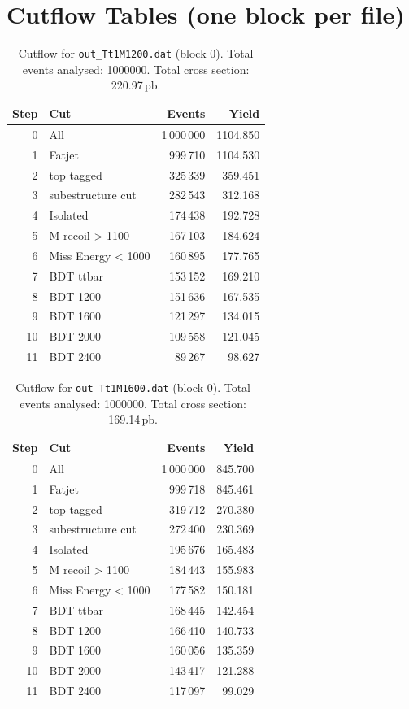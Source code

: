 \documentclass{article}
\begin{document}
\section*{Cutflow Tables (one block per file)}
\begin{table}[H]
\centering
\begin{tabular}{r l r r}
\toprule
Step & Cut & Events & Yield \\
\midrule
0 & All & 1\,000\,000 & 1104.850 \\
1 & Fatjet & 999\,710 & 1104.530 \\
2 & top tagged & 325\,339 & 359.451 \\
3 & subestructure cut & 282\,543 & 312.168 \\
4 & Isolated & 174\,438 & 192.728 \\
5 & M recoil > 1100 & 167\,103 & 184.624 \\
6 & Miss Energy < 1000 & 160\,895 & 177.765 \\
7 & BDT ttbar & 153\,152 & 169.210 \\
8 & BDT 1200 & 151\,636 & 167.535 \\
9 & BDT 1600 & 121\,297 & 134.015 \\
10 & BDT 2000 & 109\,558 & 121.045 \\
11 & BDT 2400 & 89\,267 & 98.627 \\
\bottomrule
\end{tabular}
\caption{Cutflow for \texttt{out\_Tt1M1200.dat} (block 0). Total events analysed: 1000000. Total cross section: 220.97\,pb.}
\label{tab:cutflow-out-Tt1M1200-dat}
\end{table}

\begin{table}[H]
\centering
\begin{tabular}{r l r r}
\toprule
Step & Cut & Events & Yield \\
\midrule
0 & All & 1\,000\,000 & 845.700 \\
1 & Fatjet & 999\,718 & 845.461 \\
2 & top tagged & 319\,712 & 270.380 \\
3 & subestructure cut & 272\,400 & 230.369 \\
4 & Isolated & 195\,676 & 165.483 \\
5 & M recoil > 1100 & 184\,443 & 155.983 \\
6 & Miss Energy < 1000 & 177\,582 & 150.181 \\
7 & BDT ttbar & 168\,445 & 142.454 \\
8 & BDT 1200 & 166\,410 & 140.733 \\
9 & BDT 1600 & 160\,056 & 135.359 \\
10 & BDT 2000 & 143\,417 & 121.288 \\
11 & BDT 2400 & 117\,097 & 99.029 \\
\bottomrule
\end{tabular}
\caption{Cutflow for \texttt{out\_Tt1M1600.dat} (block 0). Total events analysed: 1000000. Total cross section: 169.14\,pb.}
\label{tab:cutflow-out-Tt1M1600-dat}
\end{table}
\end{document}
